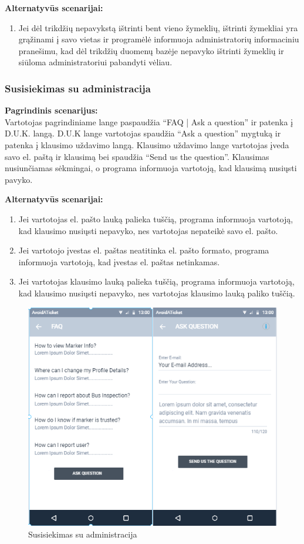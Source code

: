 \documentclass{VUMIFPSkursinis}
\begin{document}
	\textbf{Alternatyvūs scenarijai:}
	\begin{enumerate}[itemsep=-2mm]
		\item Jei dėl trikdžių nepavykstą ištrinti bent vieno žymeklių, ištrinti žymekliai yra grąžinami į savo vietas ir programėlė informuoja administratorių informaciniu pranešimu, kad dėl trikdžių duomenų bazėje nepavyko ištrinti žymeklių ir siūloma administratoriui pabandyti vėliau.
	\end{enumerate} 

\subsubsection{Susisiekimas su administracija}
	\textbf{Pagrindinis scenarijus:}\\
	Vartotojas pagrindiniame lange paspaudžia “FAQ | Ask a question” ir patenka į D.U.K. langą. D.U.K lange vartotojas 
	spaudžia “Ask a question” mygtuką ir patenka į klausimo uždavimo langą. Klausimo uždavimo lange vartotojas įveda 
	savo el. paštą ir klausimą bei spaudžia “Send us the question”. Klausimas nusiunčiamas sėkmingai, o programa informuoja 
	vartotoją, kad klausimą nusiųsti pavyko.

	\textbf{Alternatyvūs scenarijai:}
	\begin{enumerate}[itemsep=-2mm]
		\item Jei vartotojas el. pašto lauką palieka tuščią, programa informuoja vartotoją, kad klausimo nusiųsti nepavyko, nes vartotojas nepateikė savo el. pašto.
		\item Jei vartotojo įvestas el. paštas neatitinka el. pašto formato, programa informuoja vartotoją, kad įvestas el. paštas netinkamas.
		\item Jei vartotojas klausimo lauką palieka tuščią, programa informuoja vartotoją, kad klausimo nusiųsti nepavyko, nes vartotojas klausimo lauką paliko tuščią.
	\end{enumerate} 
	\begin{figure}[H]
				\centering
				\includegraphics[scale=1.4]{img/mockup_admincomunication}
				\caption{Susisiekimas su administracija}
				\label{img:Susisiekimas su administracija}
			\end{figure}
\end{document}
